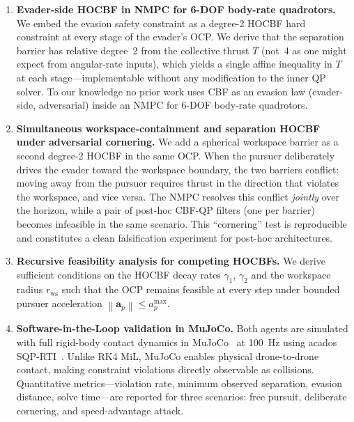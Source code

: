 \documentclass[lettersize,journal]{IEEEtran}
\theoremstyle{definition}
\theoremstyle{remark}
\newcommand{\norm}[1]{\left\| #1 \right\|}
\newcommand{\vect}[1]{\bm{#1}}
\begin{document}
\begin{enumerate}
    \item \textbf{Evader-side HOCBF in NMPC for 6-DOF body-rate quadrotors.}
    We embed the evasion safety constraint as a degree-2 HOCBF
    hard constraint at every stage of the evader's OCP.
    We derive that the separation barrier has relative degree~2 from
    the collective thrust $T$ (not~4 as one might expect from angular-rate
    inputs), which yields a single affine inequality in $T$ at each
    stage---implementable without any modification to the inner
    QP solver.
    To our knowledge no prior work uses CBF as an evasion law
    (evader-side, adversarial) inside an NMPC for 6-DOF
    body-rate quadrotors.

    \item \textbf{Simultaneous workspace-containment and
    separation HOCBF under adversarial cornering.}
    We add a spherical workspace barrier as a second degree-2 HOCBF
    in the same OCP.
    When the pursuer deliberately drives the evader toward the workspace
    boundary, the two barriers conflict: moving away from the pursuer
    requires thrust in the direction that violates the workspace, and
    vice versa.
    The NMPC resolves this conflict \emph{jointly} over the horizon,
    while a pair of post-hoc CBF-QP filters (one per barrier) becomes
    infeasible in the same scenario.
    This ``cornering'' test is reproducible and constitutes a clean
    falsification experiment for post-hoc architectures.

    \item \textbf{Recursive feasibility analysis for competing HOCBFs.}
    We derive sufficient conditions on the HOCBF decay rates
    $\gamma_1$, $\gamma_2$ and the workspace radius $r_\mathrm{ws}$
    such that the OCP remains feasible at every step under
    bounded pursuer acceleration $\norm{\vect{a}_p} \leq a_p^{\max}$.

    \item \textbf{Software-in-the-Loop validation in MuJoCo.}
    Both agents are simulated with full rigid-body contact dynamics
    in MuJoCo~\cite{todorov2012mujoco} at \SI{100}{\hertz} using
    acados SQP-RTI~\cite{verschueren2022acados}.
    Unlike RK4 MiL, MuJoCo enables physical drone-to-drone contact,
    making constraint violations directly observable as collisions.
    Quantitative metrics---violation rate, minimum observed separation,
    evasion distance, solve time---are reported for three scenarios:
    free pursuit, deliberate cornering, and speed-advantage attack.
\end{enumerate}
\end{document}
